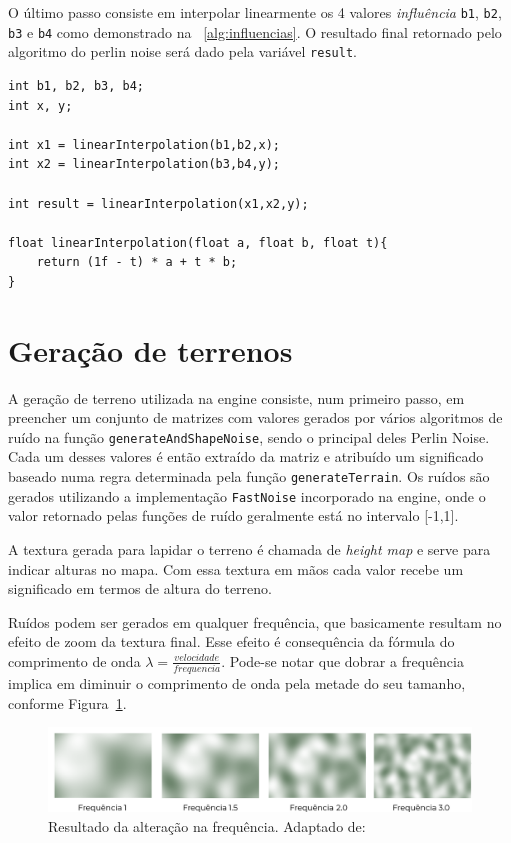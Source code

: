 \documentclass[12pt, 
openright, 
oneside, 
a4paper,    
brazil]{facom-ufu-abntex2}
\begin{document}
O último passo consiste em interpolar linearmente os 4 valores \textit{influência} \texttt{b1}, \texttt{b2}, \texttt{b3} e \texttt{b4} como demonstrado na \lstlistingname~\ref{alg:influencias}. O resultado final retornado pelo algoritmo do perlin noise será dado pela variável \texttt{result}.

\begin{lstlisting}[caption=Interpolação dos valores \textit{influência}, label={alg:influencias}]
int b1, b2, b3, b4;
int x, y; 

int x1 = linearInterpolation(b1,b2,x);
int x2 = linearInterpolation(b3,b4,y);

int result = linearInterpolation(x1,x2,y);

float linearInterpolation(float a, float b, float t){
	return (1f - t) * a + t * b;
}
\end{lstlisting}
 

\section{Geração de terrenos}
A geração de terreno utilizada na engine consiste, num primeiro passo, em preencher um conjunto de matrizes com valores gerados por vários algoritmos de ruído na função \texttt{generateAndShapeNoise}, sendo o principal deles Perlin Noise. Cada um desses valores é então extraído da matriz e atribuído um significado baseado numa regra determinada pela função \texttt{generateTerrain}. Os ruídos são gerados utilizando a implementação \texttt{FastNoise} \cite{FastNoise} incorporado na engine, onde o valor retornado pelas funções de ruído geralmente está no intervalo [-1,1]. 

A textura gerada para lapidar o terreno é chamada de \textit{height map} e serve para indicar alturas no mapa. Com essa textura em mãos cada valor recebe um significado em termos de altura do terreno.

Ruídos podem ser gerados em qualquer frequência, que basicamente resultam no efeito de zoom da textura final. Esse efeito é consequência da fórmula do comprimento de onda $\lambda = \frac{velocidade}{frequencia}$. Pode-se notar que dobrar a frequência implica em diminuir o comprimento de onda pela metade do seu tamanho, conforme Figura~\ref{fig:freq}.

\begin{figure}[H]
	\centering
	\includegraphics[width=34em]{imagens/perlinFrequencies.png}
	\caption{Resultado da alteração na frequência. Adaptado de: \cite{NoiseRedBlob}\label{fig:freq}}
\end{figure}
\end{document}
